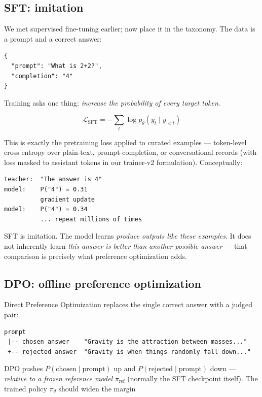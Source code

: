 \subsection{SFT: imitation}

We met supervised fine-tuning earlier; now place it in the taxonomy. The
data is a prompt and a correct answer:

\begin{lstlisting}[language={},basicstyle=\small\ttfamily]
{
  "prompt": "What is 2+2?",
  "completion": "4"
}
\end{lstlisting}

Training asks one thing: \emph{increase the probability of every target
token}.

\[
  \mathcal{L}_{\text{SFT}}
  = -\sum_{t}\log p_{\theta}\!\left(y_t \mid y_{<t}\right)
\]

This is exactly the pretraining loss applied to curated examples ---
token-level cross entropy over plain-text, prompt-completion, or
conversational records (with loss masked to assistant tokens in our
trainer-v2 formulation). Conceptually:

\begin{lstlisting}[language={},basicstyle=\small\ttfamily]
teacher:  "The answer is 4"
model:    P("4") = 0.31
          gradient update
model:    P("4") = 0.34
          ... repeat millions of times
\end{lstlisting}

SFT is imitation. The model learns \emph{produce outputs like these
examples}. It does not inherently learn \emph{this answer is better than
another possible answer} --- that comparison is precisely what preference
optimization adds.

\subsection{DPO: offline preference optimization}

Direct Preference Optimization replaces the single correct answer with a
judged pair:

\begin{lstlisting}[language={},basicstyle=\small\ttfamily]
prompt
 |-- chosen answer    "Gravity is the attraction between masses..."
 +-- rejected answer  "Gravity is when things randomly fall down..."
\end{lstlisting}

DPO pushes $P(\text{chosen}\mid\text{prompt})$ up and
$P(\text{rejected}\mid\text{prompt})$ down --- \emph{relative to a frozen
reference model} $\pi_{\text{ref}}$ (normally the SFT checkpoint itself).
The trained policy $\pi_\theta$ should widen the margin

